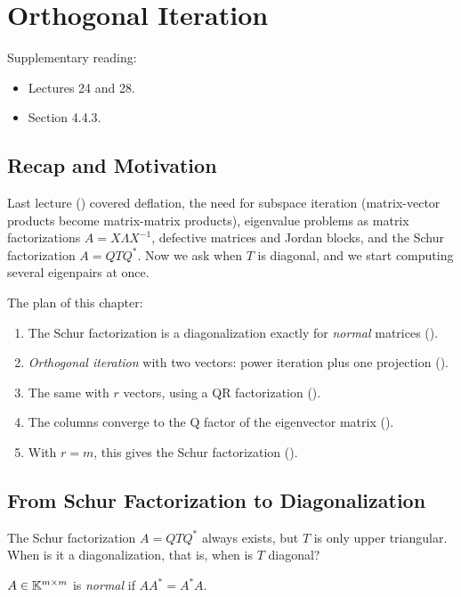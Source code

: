 \chapter{Orthogonal Iteration}
\label{ch:orth-iter}

Supplementary reading:
\begin{itemize}
  \item \cite{TB} Lectures 24 and 28.
  \item \cite{Demmel} Section 4.4.3.
\end{itemize}

\section{Recap and Motivation}

Last lecture () covered deflation, the need for subspace iteration (matrix-vector products become matrix-matrix products), eigenvalue problems as matrix factorizations $A = X\Lambda X^{-1}$, defective matrices and Jordan blocks, and the Schur factorization $A = QTQ^\ast$. Now we ask when $T$ is diagonal, and we start computing several eigenpairs at once.

The plan of this chapter:
\begin{enumerate}
  \item The Schur factorization is a diagonalization exactly for \emph{normal} matrices ().
  \item \emph{Orthogonal iteration} with two vectors: power iteration plus one projection ().
  \item The same with $r$ vectors, using a QR factorization ().
  \item The columns converge to the Q factor of the eigenvector matrix ().
  \item With $r = m$, this gives the Schur factorization ().
\end{enumerate}

\section{From Schur Factorization to Diagonalization}
\label{sec:normal}

The Schur factorization $A = QTQ^\ast$ always exists, but $T$ is only upper triangular. When is it a diagonalization, that is, when is $T$ diagonal?

\begin{definition}
  \label{def:normal}
  $A \in \mathbb{K}^{m \times m}$ is \emph{normal} if $AA^\ast = A^\ast A$.
\end{definition}

